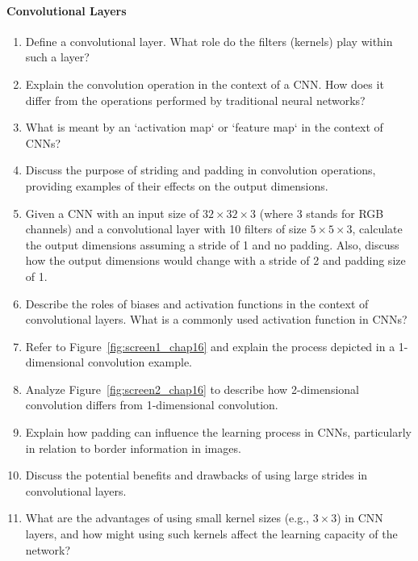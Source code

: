 \paragraph*{Convolutional Layers}
\begin{enumerate}
    \item Define a convolutional layer. What role do the filters (kernels) play within such a layer?
    \item Explain the convolution operation in the context of a CNN. How does it differ from the operations performed by traditional neural networks?
    \item What is meant by an `activation map` or `feature map` in the context of CNNs?
    \item Discuss the purpose of striding and padding in convolution operations, providing examples of their effects on the output dimensions.
    \item Given a CNN with an input size of $32 \times 32 \times 3$ (where 3 stands for RGB channels) and a convolutional layer with 10 filters of size $5 \times 5 \times 3$, calculate the output dimensions assuming a stride of 1 and no padding. Also, discuss how the output dimensions would change with a stride of 2 and padding size of 1.
    \item Describe the roles of biases and activation functions in the context of convolutional layers. What is a commonly used activation function in CNNs?
    \item Refer to Figure~\ref{fig:screen1_chap16} and explain the process depicted in a 1-dimensional convolution example.
    \item Analyze Figure~\ref{fig:screen2_chap16} to describe how 2-dimensional convolution differs from 1-dimensional convolution. 
    \item Explain how padding can influence the learning process in CNNs, particularly in relation to border information in images.
    \item Discuss the potential benefits and drawbacks of using large strides in convolutional layers.
    \item What are the advantages of using small kernel sizes (e.g., $3 \times 3$) in CNN layers, and how might using such kernels affect the learning capacity of the network?
\end{enumerate}
